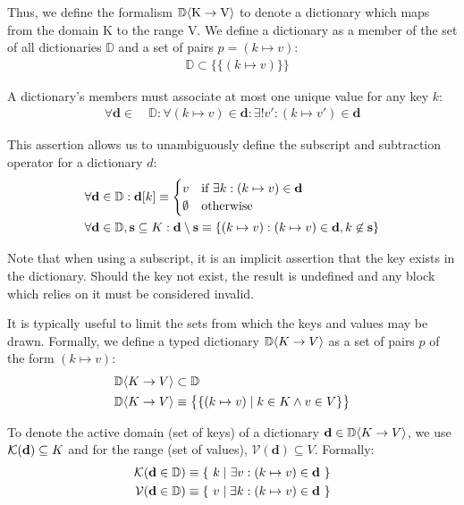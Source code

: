 Thus, we define the formalism $\mathbb{D}\langle \mathrm{K}\to\mathrm{V}\rangle$ to denote a dictionary which maps from the domain $\mathrm{K}$ to the range $\mathrm{V}$. We define a dictionary as a member of the set of all dictionaries $\mathbb{D}$ and a set of pairs $p = (k \mapsto v)$:
\begin{align}
  &\mathbb{D} \subset \big \{ \{ (k \mapsto v) \} \big \}
\end{align}

A dictionary's members must associate at most one unique value for any key $k$:
\begin{align}
  \forall \mathbf{d} \in\ &\mathbb{D} : \forall (k \mapsto v) \in \mathbf{d} : \exists! v' : (k \mapsto v') \in \mathbf{d}
\end{align}

This assertion allows us to unambiguously define the subscript and subtraction operator for a dictionary $d$:
\begin{align}
  \forall \mathbf{d} \in \mathbb{D}&: \mathbf{d}[k] \equiv \begin{cases}
    v & \text{if}\ \exists k : (k \mapsto v) \in \mathbf{d} \\
    \emptyset & \text{otherwise}
  \end{cases}\\
  \forall \mathbf{d} \in \mathbb{D}&, \mathbf{s} \subseteq K: \mathbf{d} \setminus \mathbf{s} \equiv \{ (k \mapsto v): (k \mapsto v) \in \mathbf{d}, k \not \in \mathbf{s} \}
\end{align}

Note that when using a subscript, it is an implicit assertion that the key exists in the dictionary. Should the key not exist, the result is undefined and any block which relies on it must be considered invalid.

It is typically useful to limit the sets from which the keys and values may be drawn. Formally, we define a typed dictionary $\mathbb{D}\langle K\to V\rangle$ as a set of pairs $p$ of the form $(k \mapsto v)$:
\begin{align}
  \mathbb{D}\langle K\to V\rangle &\subset \mathbb{D} \\
  \mathbb{D}\langle K\to V\rangle &\equiv \big \{ \{ (k \mapsto v) \mid k \in K \wedge v \in V \} \big \}
\end{align}

To denote the active domain (\ie set of keys) of a dictionary $\mathbf{d} \in \mathbb{D}\langle K\to V\rangle$, we use $\mathcal{K}(\mathbf{d}) \subseteq K$ and for the range (\ie set of values), $\mathcal{V}(\mathbf{d}) \subseteq V$. Formally:
\begin{align}
  \mathcal{K}(\mathbf{d} \in \mathbb{D}) &\equiv \{\ k \mid \exists v : (k \mapsto v) \in \mathbf{d}\ \} \\
  \mathcal{V}(\mathbf{d} \in \mathbb{D}) &\equiv \{\ v \mid \exists k : (k \mapsto v) \in \mathbf{d}\ \}
\end{align}


